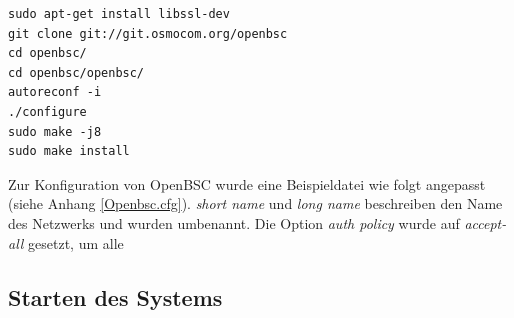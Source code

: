 \begin{lstlisting}
sudo apt-get install libssl-dev
git clone git://git.osmocom.org/openbsc
cd openbsc/
cd openbsc/openbsc/
autoreconf -i
./configure 
sudo make -j8
sudo make install
\end{lstlisting}

Zur Konfiguration von OpenBSC wurde eine Beispieldatei wie folgt angepasst (siehe Anhang \ref{Openbsc.cfg}). \textit{short name} und \textit{long name} beschreiben den Name des Netzwerks und wurden umbenannt. Die Option \textit{auth policy} wurde auf \textit{accept-all} gesetzt, um alle


\subsection{Starten des Systems}
